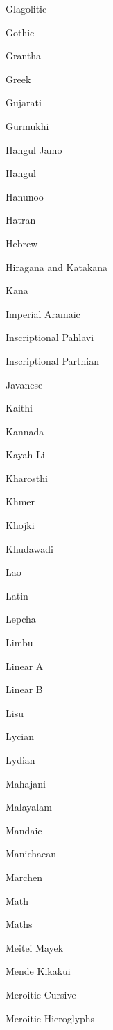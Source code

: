 \documentclass[a4paper]{l3doc}
\begin{document}
\begin{table}[!hbp]
\begin{multicols}{4}
    Glagolitic \par
    Gothic \par
    Grantha \par
    Greek \par
    Gujarati \par
    Gurmukhi \par
    Hangul Jamo \par
    Hangul \par
    Hanunoo \par
    Hatran \par
    Hebrew \par
    \dup Hiragana and Katakana \par
    \dup Kana \par
    Imperial Aramaic \par
    Inscriptional Pahlavi \par
    Inscriptional Parthian \par
    Javanese \par
    Kaithi \par
    Kannada \par
    Kayah Li \par
    Kharosthi \par
    Khmer \par
    Khojki \par
    Khudawadi \par
    Lao \par
    Latin \par
    Lepcha \par
    Limbu \par
    Linear A \par
    Linear B \par
    Lisu \par
    Lycian \par
    Lydian \par
    Mahajani \par
    Malayalam \par
    Mandaic \par
    Manichaean \par
    Marchen \par
    \dup Math \par
    \dup Maths \par
    Meitei Mayek \par
    Mende Kikakui \par
    Meroitic Cursive \par
    Meroitic Hieroglyphs \par

\end{multicols}
\end{table}
\end{document}
